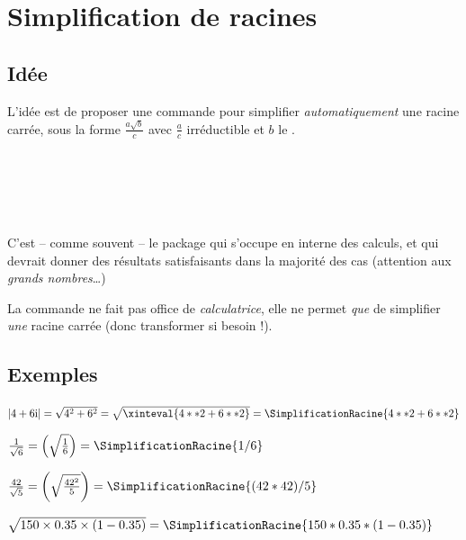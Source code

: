 \documentclass[a4paper,french,11pt]{article}
\newcommand\ctex[1]{\tcbox[vignettelatex]{#1}}
\newcommand\cmaj[1]{%
	{\tcbox[vignetteMaJ]{#1}\xspace}%
}
\begin{document}
\newpage

\section{Simplification de racines}\label{simplracine}

\subsection{Idée}

\begin{codeidee}
\cmaj{2.1.0} L'idée est de proposer une commande pour simplifier \textit{automatiquement} une racine carrée, sous la forme $\frac{a\sqrt{b}}{c}$ avec $\frac{a}{c}$ irréductible et $b$ le .
\end{codeidee}

\begin{codetex}
\end{codetex}

\begin{codetex}[]
\\
\\
\\
\\
\end{codetex}

\begin{codeinfo}
C'est -- comme souvent -- le package \ctex{xint} qui s'occupe en interne des calculs, et qui devrait donner des résultats satisfaisants dans la majorité des cas (attention aux \textit{grands nombres}\ldots)

\smallskip

La commande ne fait pas office de \textit{calculatrice}, elle ne permet \textit{que} de simplifier \textit{une} racine carrée (donc transformer si besoin !).
\end{codeinfo}

\subsection{Exemples}

\begin{codetex}[]
$\left| 4+6\text{i}\right| = \sqrt{4^2+6^2} = \sqrt{\xinteval{4**2+6**2}}=\SimplificationRacine{4**2+6**2}$

$\frac{1}{\sqrt{6}}=\left(\sqrt{\frac{1}{6}}\right)=\SimplificationRacine{1/6}$

$\frac{42}{\sqrt{5}}=\left(\sqrt{\frac{42^2}{5}}\right)=\SimplificationRacine{(42*42)/5}$

$\sqrt{\num{150}\times\num{0.35}\times(1-\num{0.35})}=\displaystyle\SimplificationRacine{150*0.35*(1-0.35)}$
\end{codetex}
\end{document}
